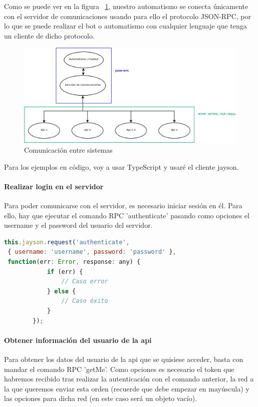 \documentclass[spanish,12pt, a4paper, twoside]{paper}
\begin{document}
Como se puede ver en la figura ~\ref{fig:Comunicación entre sistemas}, nuestro automatismo se conecta únicamente con el servidor de comunicaciones usando para ello el protocolo JSON-RPC, por lo que se puede realizar el bot o automatismo con cualquier lenguaje que tenga un cliente de dicho protocolo.

\begin{figure}
\centering
	\includegraphics[width=\textwidth]{recursos/Comunication}
\caption{Comunicación entre sistemas}
\label{fig:Comunicación entre sistemas}
\end{figure}

Para los ejemplos en código, voy a usar TypeScript y usaré el cliente jayson.

\paragraph{Realizar login en el servidor}

Para poder comunicarse con el servidor, es necesario iniciar sesión en él. Para ello, hay que ejecutar el comando RPC 'authenticate' pasando como opciones el username y el password del usuario del servidor.

\begin{lstlisting}[language=JavaScript]
this.jayson.request('authenticate',
 { username: 'username', password: 'password' },
 function(err: Error, response: any) {
			if (err) { 
				// Caso error
			} else {
				// Caso éxito
			}
		});
\end{lstlisting}

\paragraph{Obtener información del usuario de la api}

Para obtener los datos del usuario de la api que se quisiese acceder, basta con mandar el comando RPC 'getMe'. Como opciones es necesario el token que habremos recibido tras realizar la autenticación con el comando anterior, la red a la que queremos enviar esta orden (recuerde que debe empezar en mayúscula) y las opciones para dicha red (en este caso será un objeto vacío).
\end{document}

